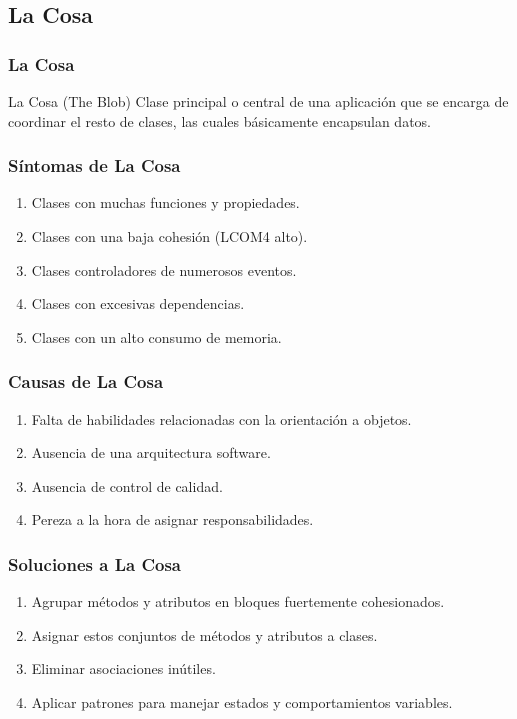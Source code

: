 ﻿\documentclass[animated,a4paper,slidestop,xcolor=pst,blue]{beamer}
\begin{document}
\subsection{La Cosa}

\begin{frame}
	\frametitle{La Cosa}
	\begin{block}{La Cosa (The Blob)}
        Clase principal o central de una aplicación que se encarga de coordinar el resto de clases, las cuales básicamente encapsulan datos.
	\end{block}
\end{frame}

\begin{frame}[c]
    \frametitle{Síntomas de La Cosa}
    \begin{enumerate}[<+->]
        \item Clases con muchas funciones y propiedades.
        \item Clases con una baja cohesión (LCOM4 alto).
        \item Clases controladores de numerosos eventos.
        \item Clases con excesivas dependencias.
        \item Clases con un alto consumo de memoria.
    \end{enumerate}
\end{frame}

\begin{frame}[c]
	\frametitle{Causas de La Cosa}
    \begin{enumerate} [<+->]
        \item Falta de habilidades relacionadas con la orientación a objetos.
        \item Ausencia de una arquitectura software.
        \item Ausencia de control de calidad.
        \item Pereza a la hora de asignar responsabilidades.
    \end{enumerate}
\end{frame}

\begin{frame}[c]
    \frametitle{Soluciones a La Cosa}
    \begin{enumerate}[<+->]
        \item Agrupar métodos y atributos en bloques fuertemente cohesionados.
        \item Asignar estos conjuntos de métodos y atributos a clases.
        \item Eliminar asociaciones inútiles.
        \item Aplicar patrones para manejar estados y comportamientos variables.
    \end{enumerate}
\end{frame}
\end{document}

